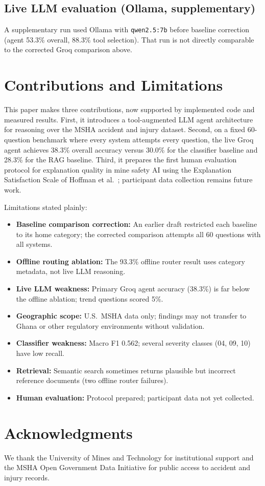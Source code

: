 \documentclass[11pt,a4paper]{article}
\begin{document}
\subsection{Live LLM evaluation (Ollama, supplementary)}
\label{sec:live-llm}

A supplementary run used Ollama with \texttt{qwen2.5:7b} before baseline
correction (agent 53.3\% overall, 88.3\% tool selection). That run is not
directly comparable to the corrected Groq comparison above.

\section{Contributions and Limitations}
\label{sec:discussion}

This paper makes three contributions, now supported by implemented code and
measured results. First, it introduces a tool-augmented LLM agent architecture
for reasoning over the MSHA accident and injury dataset. Second, on a fixed
60-question benchmark where every system attempts every question, the live Groq
agent achieves 38.3\% overall accuracy versus 30.0\% for the classifier baseline
and 28.3\% for the RAG baseline. Third, it prepares the first human evaluation
protocol for explanation quality in mine safety AI using the Explanation
Satisfaction Scale of Hoffman et al.~\cite{Hoffman2023}; participant data
collection remains future work.

Limitations stated plainly:
\begin{itemize}
  \item \textbf{Baseline comparison correction:} An earlier draft restricted
    each baseline to its home category; the corrected comparison attempts all
    60 questions with all systems.
  \item \textbf{Offline routing ablation:} The 93.3\% offline router result uses
    category metadata, not live LLM reasoning.
  \item \textbf{Live LLM weakness:} Primary Groq agent accuracy (38.3\%) is far
    below the offline ablation; trend questions scored 5\%.
  \item \textbf{Geographic scope:} U.S.\ MSHA data only; findings may not transfer
    to Ghana or other regulatory environments without validation.
  \item \textbf{Classifier weakness:} Macro F1 0.562; several severity classes
    (04, 09, 10) have low recall.
  \item \textbf{Retrieval:} Semantic search sometimes returns plausible but
    incorrect reference documents (two offline router failures).
  \item \textbf{Human evaluation:} Protocol prepared; participant data not yet
    collected.
\end{itemize}

\section*{Acknowledgments}

We thank the University of Mines and Technology for institutional support and
the MSHA Open Government Data Initiative for public access to accident and
injury records.



\end{document}
